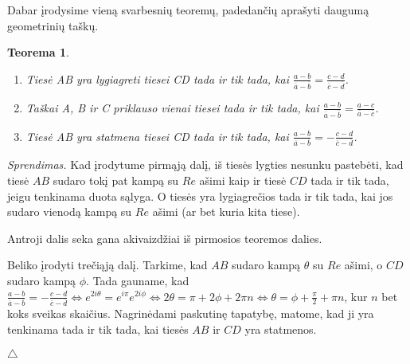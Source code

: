 \documentclass[11pt,a4paper,twoside]{book}
\newenvironment{sprendimas}{\noindent \textit{Sprendimas.}}{\hfill $\triangle$}
\newtheorem{thmnr}{Teorema}
\theoremstyle{definition} \newtheorem*{api}{Apibrėžimas}
\theoremstyle{remark} \newtheorem*{pastaba}{Pastaba}
\begin{document}
\bigskip
Dabar įrodysime vieną svarbesnių teoremų, padedančių aprašyti daugumą geometrinių taškų.

\begin{thmnr}\
\begin{enumerate}
\item Tiesė AB yra lygiagreti tiesei CD tada ir tik tada, kai $\frac{a - b}{\overline{a} -\overline{b}}=\frac{c - d}{\overline{c} - \overline{d}}$.
\item Taškai A, B ir C priklauso vienai tiesei tada ir tik tada, kai $\frac{a - b}{\overline{a} -\overline{b}}=\frac{a-c}{\overline{a} - \overline{c}}$.
\item Tiesė AB yra statmena tiesei CD tada ir tik tada, kai $\frac{a - b}{\overline{a} -\overline{b}}=-\frac{c - d}{\overline{c} - \overline{d}}$.
\end{enumerate}
\end{thmnr}
\begin{sprendimas} Kad įrodytume pirmąją dalį, iš tiesės lygties nesunku pastebėti, kad tiesė $AB$ sudaro tokį pat kampą su $Re$ ašimi kaip ir tiesė $CD$ tada ir tik tada, jeigu tenkinama duota sąlyga. O tiesės yra lygiagrečios tada ir tik tada, kai jos sudaro vienodą kampą su $Re$ ašimi (ar bet kuria kita tiese).

Antroji dalis seka gana akivaizdžiai iš pirmosios teoremos dalies.

Beliko įrodyti trečiąją dalį. Tarkime, kad $AB$ sudaro kampą $\theta$ su $Re$ ašimi, o $CD$ sudaro kampą $\phi$. Tada gauname, kad $\frac{a - b}{\overline{a} -\overline{b}}=-\frac{c - d}{\overline{c} - \overline{d}} \Leftrightarrow e^{2i\theta}=e^{i\pi}e^{2i\phi} \Leftrightarrow 2\theta = \pi + 2\phi + 2\pi n \Leftrightarrow \theta = \phi + \frac{\pi}{2} + \pi n $, kur $n$ bet koks sveikas skaičius. Nagrinėdami paskutinę tapatybę, matome, kad ji yra tenkinama tada ir tik tada, kai tiesės $AB$ ir $CD$ yra statmenos.

\end{sprendimas}
\end{document}
